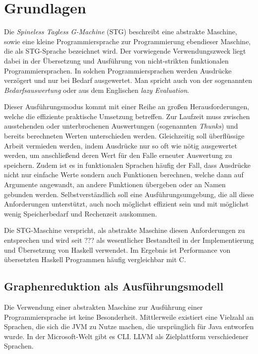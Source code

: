 
\chapter{Grundlagen}\label{chap:grundlagen}

Die \textit{Spineless Tagless G-Machine} (STG) beschreibt eine abstrakte Maschine, sowie eine kleine Programmiersprache zur Programmierung ebendieser Maschine, die als STG-Sprache bezeichnet wird.
Der vorwiegende Verwendungszweck liegt dabei in der Übersetzung und Ausführung von nicht-strikten funktionalen Programmiersprachen.
In solchen Programmiersprachen werden Ausdrücke verzögert und nur bei Bedarf ausgewertet.
Man spricht auch von der sogenannten \textit{Bedarfsauswertung} oder aus dem Englischen \textit{lazy Evaluation}.

Dieser Ausführungsmodus kommt mit einer Reihe an großen Herausforderungen, welche die effiziente praktische Umsetzung betreffen.
Zur Laufzeit muss zwischen ausstehenden oder unterbrochenen Auswertungen (sogenannten \textit{Thunks}) und bereits berechneten Werten unterschieden werden.
Gleichzeitig soll überflüssige Arbeit vermieden werden, indem Ausdrücke nur so oft wie nötig ausgewertet werden, um anschließend deren Wert für den Falle erneuter Auswertung zu speichern.
Zudem ist es in funktionalen Sprachen häufig der Fall, dass Ausdrücke nicht nur einfache Werte sondern auch Funktionen berechnen, welche dann auf Argumente angewandt, an andere Funktionen übergeben oder an Namen gebunden werden.
Selbstverständlich soll eine Ausführungsumgebung, die all diese Anforderungen unterstützt, auch noch möglichst effizient sein und mit möglichst wenig Speicherbedarf und Rechenzeit auskommen.

Die STG-Maschine verspricht, als abstrakte Maschine diesen Anforderungen zu entsprechen und wird seit ??? als  wesentlicher Bestandteil in der Implementierung und Übersetzung von Haskell verwendet.
Im Ergebnis ist Performance von übersetzten Haskell Programmen häufig vergleichbar mit C.\cn{}


\section{Graphenreduktion als Ausführungsmodell}

Die Verwendung einer abstrakten Maschine zur Ausführung einer Programmiersprache ist keine Besonderheit.
Mittlerweile existiert eine Vielzahl an Sprachen, die sich die JVM zu Nutze machen, die ursprünglich für Java entworfen wurde.
In der Microsoft-Welt gibt es CLI. %
LLVM als Zielplattform verschiedener Sprachen.

